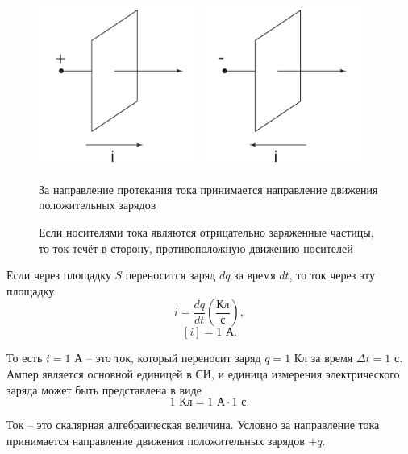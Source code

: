     \begin{figure}[t!]
        \center
        \includegraphics[width=0.47\textwidth]{lec06/cur_dir_+.pdf}
        \hfill
        \includegraphics[width=0.47\textwidth]{lec06/cur_dir_-.pdf}
        \parbox[t]{.47\textwidth}{\caption{За направление протекания тока
            принимается направление движения положительных зарядов}}
        \hfill
        \parbox[t]{.47\textwidth}{\caption{Если носителями тока являются
                            отрицательно заряженные частицы, то ток течёт
                            в сторону, противоположную движению носителей}}
    \end{figure}

    Если через площадку \( S \) переносится заряд \( dq \) за время \( dt \),
    то ток через эту площадку:
    \[
        i = \frac{dq}{dt} \left(\frac{\text{Кл}}{\text{с}}\right),
    \]
    \[
        [i] = 1\text{ А}.
    \]
    
    То есть \( i = 1 \) А -- это ток, который переносит заряд \( q = 1 \) Кл
    за время \( \Delta t = 1 \) с. Ампер является основной единицей в СИ, и
    единица измерения электрического заряда может быть представлена в виде
    \[
        1 \text{ Кл} = 1 \text{ А} \cdot 1 \text{ с}.
    \]

    Ток -- это скалярная алгебраическая величина. Условно за направление тока
    принимается направление движения положительных зарядов \( +q \).
    

